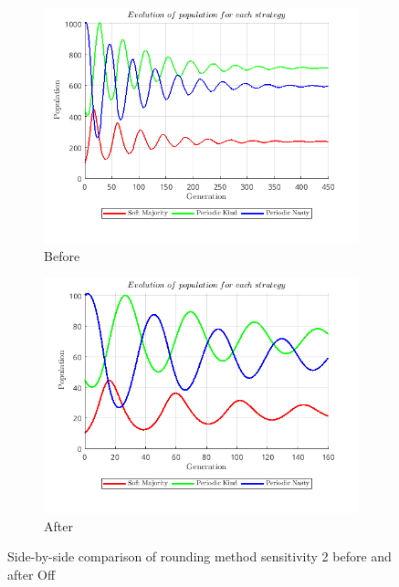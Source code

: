 \documentclass[12pt]{report}
\begin{document}
\begin{figure}[H]
    \centering
    \begin{subfigure}[t]{0.45\textwidth}
        \centering
        \includegraphics[width=\textwidth]{rounding_method_sensitivity_2_before_off.png}
        \caption{Before}
    \end{subfigure}
    \hfill
    \begin{subfigure}[t]{0.45\textwidth}
        \centering
        \includegraphics[width=\textwidth]{rounding_method_sensitivity_2_after_off.png}
        \caption{After}
    \end{subfigure}
    \caption{Side-by-side comparison of rounding method sensitivity 2 before and after Off}
\end{figure}
\end{document}
